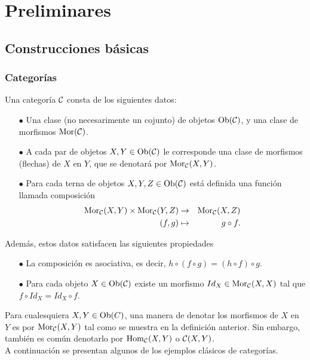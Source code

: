 \chapter{Preliminares}

\section{Construcciones básicas}
\subsection{Categorías}
\begin{definition}[Categoría]
 Una categoría ${\mathcal C}$ consta de los siguientes datos: 
    \begin{enumerate}
        \item[$\bullet$]  Una clase (no necesarimente un cojunto) de objetos $\operatorname{Ob}({\mathcal C})$, y una clase de morfismos ${\mathrm{Mor}}({\mathcal C})$. 
        \item[$\bullet$]  A cada par de objetos $X,Y\in \operatorname{Ob}({\mathcal C})$ le  
        corresponde  una clase de morfismos (flechas) de $X$ en $Y$, que se denotará por ${\mathrm{Mor}}_{\mathcal C}(X,Y)$.
        \item[$\bullet$]  Para cada terna de objetos $X,Y,Z\in\operatorname{Ob}({\mathcal C})$ está definida una función llamada composición 
	\begin{eqnarray*}
	{\mathrm{Mor}}_{\mathcal C}(X,Y)\times {\mathrm{Mor}}_{\mathcal C}(Y,Z)&\rightarrow & {\mathrm{Mor}}_{\mathcal C}(X,Z)\\
 	(f,g)&\mapsto& g\circ f.
	\end{eqnarray*}
    \end{enumerate}
Además, estos datos satisfacen las siguientes propiedades
\begin{enumerate}
    \item[$\bullet$] La composición es asociativa, es decir, $h\circ(f\circ g)=(h\circ f)\circ g$.
    \item[$\bullet$]  Para cada objeto $X\in \operatorname{Ob}({\mathcal C})$ existe un morfismo $Id_X\in {\mathrm{Mor}}_{\mathcal C}(X,X)$ tal que $f\circ Id_X=Id_X\circ f.$
\end{enumerate}
\end{definition}
Para cualesquiera $X,Y\in\operatorname{Ob}(C)$, una manera de denotar los morfismos de $X$ en $Y$ es por ${\mathrm{Mor}}_{\mathcal C}(X,Y)$ tal como se muestra en la definición anterior. Sin embargo, también es común denotarlo por  $\operatorname{Hom}_{\mathcal C}(X,Y)$ o ${\mathcal C}(X,Y)$.\\ A continuación se presentan algunos de los ejemplos clásicos de categorías.
